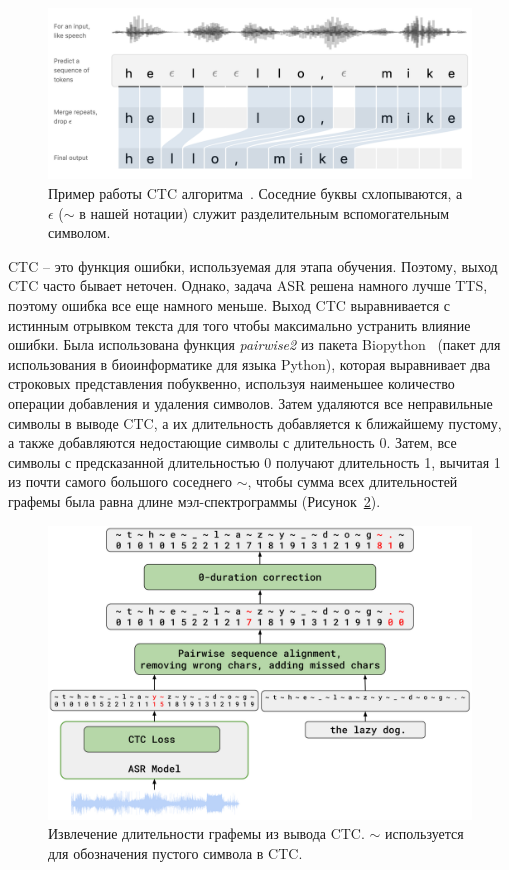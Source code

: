 \begin{figure}[!ht]
\centering
\includegraphics[width=1.0\textwidth]{images/snippets/ctc.png}
\caption{Пример работы CTC алгоритма~\cite{hannun2017sequence}. Соседние буквы схлопываются, а $\epsilon$ ($\sim$ в нашей нотации) служит разделительным вспомогательным символом.}
\label{fig:ctc}
\end{figure}

CTC -- это функция ошибки, используемая для этапа обучения. Поэтому, выход CTC часто бывает неточен. Однако, задача ASR решена намного лучше TTS, поэтому ошибка все еще намного меньше. Выход CTC выравнивается с истинным отрывком текста для того чтобы максимально устранить влияние ошибки. Была использована функция \textit{pairwise2} из пакета Biopython~\cite{biopython} (пакет для использования в биоинформатике для языка Python), которая выравнивает два строковых представления побуквенно, используя наименьшее количество операции добавления и удаления символов. Затем удаляются все неправильные символы в выводе CTC, а их длительность добавляется к ближайшему пустому, а также добавляются недостающие символы с длительность $0$. Затем, все символы с предсказанной длительностью 0 получают длительность 1, вычитая 1 из почти самого большого соседнего $\sim$, чтобы сумма всех длительностей графемы была равна длине мэл-спектрограммы (Рисунок~\ref{fig:alignment}).

\begin{figure}[!ht]
\centering
\includegraphics[width=1.0\textwidth]{images/alignment.png}
\caption{Извлечение длительности графемы из вывода CTC. $\sim$ используется для обозначения пустого символа в CTC.}
\label{fig:alignment}
\end{figure}

